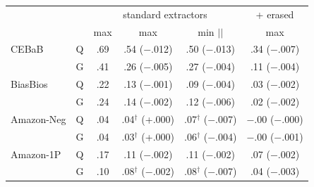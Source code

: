 \begin{tabular}{@{}llcccc@{}}
\toprule
 & & \multicolumn{3}{c}{standard extractors} & + erased \\
 & & max \dec{} & max \conf{} & min $|$\leak{}$|$ & max \conf{} \\
\midrule
CEBaB & Q & .69 & .54 ($-$.012) & .50 ($-$.013) & .34 ($-$.007) \\
 & G & .41 & .26 ($-$.005) & .27 ($-$.004) & .11 ($-$.004) \\
BiasBios & Q & .22 & .13 ($-$.001) & .09 ($-$.004) & .03 ($-$.002) \\
 & G & .24 & .14 ($-$.002) & .12 ($-$.006) & .02 ($-$.002) \\
Amazon-Neg & Q & .04 & .04$^\dagger$ (+.000) & .07$^\dagger$ ($-$.007) & $-$.00 ($-$.000) \\
 & G & .04 & .03$^\dagger$ (+.000) & .06$^\dagger$ ($-$.004) & $-$.00 ($-$.001) \\
Amazon-1P & Q & .17 & .11 ($-$.002) & .11 ($-$.002) & .07 ($-$.002) \\
 & G & .10 & .08$^\dagger$ ($-$.002) & .08$^\dagger$ ($-$.007) & .04 ($-$.003) \\
\bottomrule
\end{tabular}
